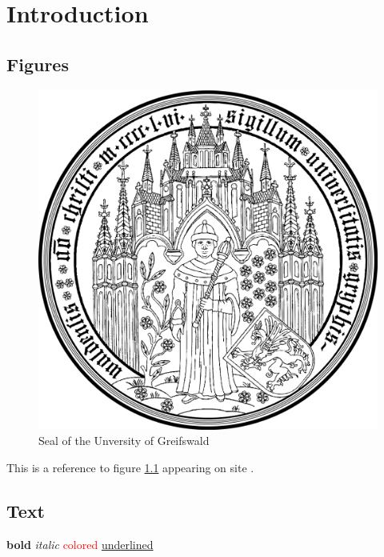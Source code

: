 \chapter{Introduction}

\section{Figures}
    
\blindtext[1]
        
\begin{figure}[ht]
    \centering
    \includegraphics[scale=0.1]{img/logo.png} 
    \caption[Seal of the University of Greifswald]{Seal of the Unversity of Greifswald \parencite[S. 42]{dirac}}
    \label{seal}
\end{figure}
        
\noindent This is a reference to figure \ref{seal} appearing on site \pageref{seal}.
        
\section{Text}

\textbf{bold} \textit{italic} 
\textcolor{red}{colored} \underline{underlined}